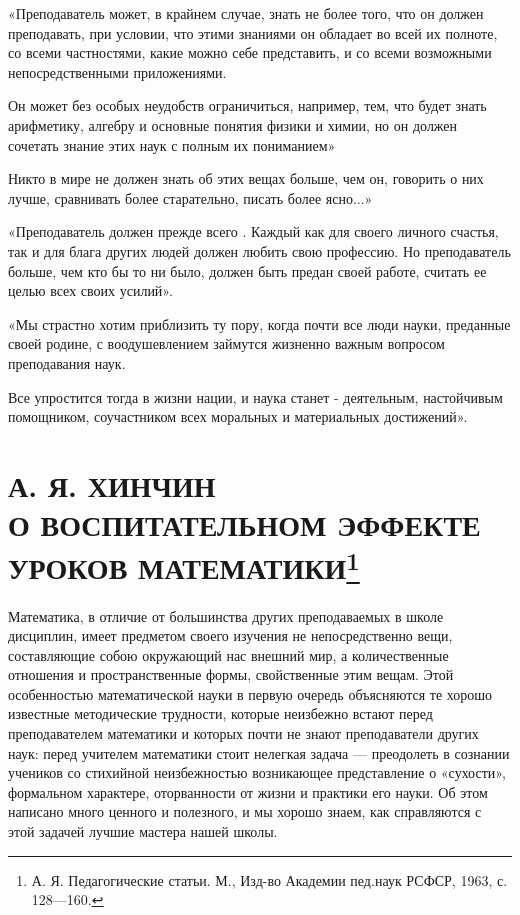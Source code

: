 \documentclass[12pt, a4paper, openany]{book}
\begin{document}
«Преподаватель может, в крайнем случае, знать не более того, что он должен преподавать, при условии, что этими знаниями он обладает во всей их полноте, со всеми  частностями, какие можно себе представить, и со всеми  возможными непосредственными приложениями. 

Он может без особых неудобств ограничиться,  например, тем, что будет знать арифметику, алгебру и основные понятия физики и химии, но он должен сочетать знание этих наук с полным их пониманием» 

Никто в мире не должен знать об этих вещах больше, чем он, говорить о них лучше, сравнивать более  старательно, писать более ясно...» 

«Преподаватель должен прежде всего . Каждый как для своего личного счастья, так и для блага других людей должен любить свою профессию. Но преподаватель больше, чем кто бы то ни было, должен быть предан своей работе, считать ее целью всех своих усилий». 

«Мы страстно хотим приблизить ту пору, когда почти все люди науки, преданные своей родине, с  воодушевлением займутся жизненно важным вопросом преподавания наук. 

Все упростится тогда в жизни нации, и наука станет - деятельным, настойчивым помощником, соучастником всех моральных и материальных достижений». 

\section[\textls{А. Я. Хинчин}. О воспитательном эффекте уроков математики]{{\small А. Я. ХИНЧИН } \\ \textbf{О ВОСПИТАТЕЛЬНОМ ЭФФЕКТЕ УРОКОВ МАТЕМАТИКИ{\footnote{ А. Я. Педагогические статьи. М., Изд-во Академии пед.наук РСФСР, 1963, с. 128—160. }}}}


Математика, в отличие от большинства других  преподаваемых в школе дисциплин, имеет предметом своего изучения не непосредственно вещи, составляющие собою  окружающий нас внешний мир, а количественные отношения и  пространственные формы, свойственные этим вещам. Этой  особенностью математической науки в первую очередь  объясняются те хорошо известные методические трудности,  которые неизбежно встают перед преподавателем математики и которых почти не знают преподаватели других наук: перед учителем математики стоит нелегкая задача —  преодолеть в сознании учеников со стихийной неизбежностью возникающее представление о «сухости», формальном  характере, оторванности от жизни и практики его науки. Об этом написано много ценного и полезного, и мы хорошо знаем, как справляются с этой задачей лучшие  мастера нашей школы. 
\end{document}
